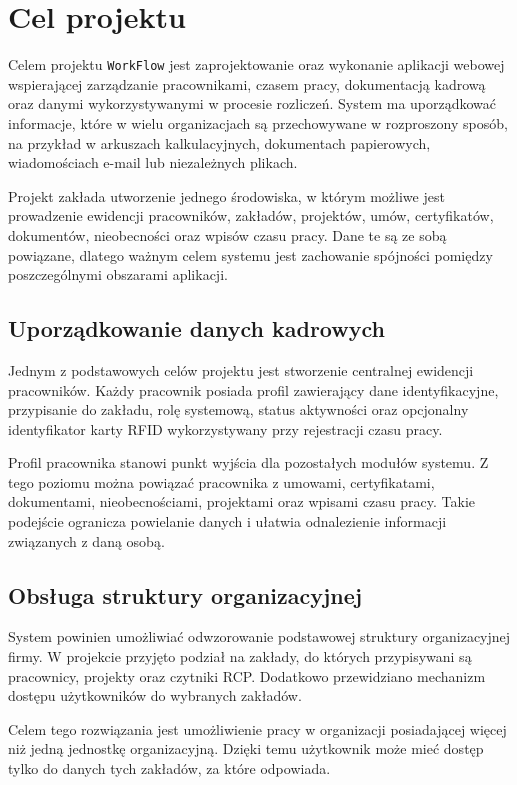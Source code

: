 \section{Cel projektu}

Celem projektu \texttt{WorkFlow} jest zaprojektowanie oraz wykonanie aplikacji webowej wspierającej zarządzanie pracownikami, czasem pracy, dokumentacją kadrową oraz danymi wykorzystywanymi w procesie rozliczeń. System ma uporządkować informacje, które w wielu organizacjach są przechowywane w rozproszony sposób, na przykład w arkuszach kalkulacyjnych, dokumentach papierowych, wiadomościach e-mail lub niezależnych plikach.

Projekt zakłada utworzenie jednego środowiska, w którym możliwe jest prowadzenie ewidencji pracowników, zakładów, projektów, umów, certyfikatów, dokumentów, nieobecności oraz wpisów czasu pracy. Dane te są ze sobą powiązane, dlatego ważnym celem systemu jest zachowanie spójności pomiędzy poszczególnymi obszarami aplikacji.

\subsection{Uporządkowanie danych kadrowych}

Jednym z podstawowych celów projektu jest stworzenie centralnej ewidencji pracowników. Każdy pracownik posiada profil zawierający dane identyfikacyjne, przypisanie do zakładu, rolę systemową, status aktywności oraz opcjonalny identyfikator karty RFID wykorzystywany przy rejestracji czasu pracy.

Profil pracownika stanowi punkt wyjścia dla pozostałych modułów systemu. Z tego poziomu można powiązać pracownika z umowami, certyfikatami, dokumentami, nieobecnościami, projektami oraz wpisami czasu pracy. Takie podejście ogranicza powielanie danych i ułatwia odnalezienie informacji związanych z daną osobą.

\subsection{Obsługa struktury organizacyjnej}

System powinien umożliwiać odwzorowanie podstawowej struktury organizacyjnej firmy. W projekcie przyjęto podział na zakłady, do których przypisywani są pracownicy, projekty oraz czytniki RCP. Dodatkowo przewidziano mechanizm dostępu użytkowników do wybranych zakładów.

Celem tego rozwiązania jest umożliwienie pracy w organizacji posiadającej więcej niż jedną jednostkę organizacyjną. Dzięki temu użytkownik może mieć dostęp tylko do danych tych zakładów, za które odpowiada.

